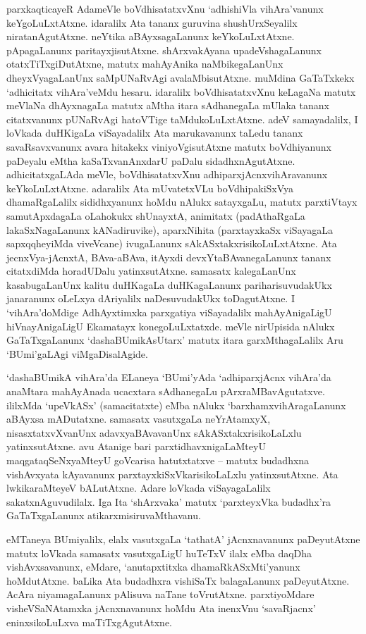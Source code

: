 parxkaqticayeR AdameVle boVdhisatatxvXnu `adhishiVla vihAra'vanunx keYgoLuLxtAtxne. idaralilx Ata tananx guruvina shushUrxSeyalilx niratanAgutAtxne. neYtika aBAyxsagaLanunx keYkoLuLxtAtxne. pApagaLanunx paritayxjisutAtxne. shArxvakAyana upadeVshagaLanunx otatxTiTxgiDutAtxne, matutx mahAyAnika naMbikegaLanUnx dheyxVyagaLanUnx saMpUNaRvAgi avalaMbisutAtxne. muMdina GaTaTxkekx `adhicitatx vihAra'veMdu hesaru. idaralilx boVdhisatatxvXnu keLagaNa matutx meVlaNa dhAyxnagaLa matutx aMtha itara sAdhanegaLa mUlaka tananx citatxvanunx pUNaRvAgi hatoVTige taMdukoLuLxtAtxne. adeV samayadalilx, I loVkada duHKigaLa viSayadalilx Ata marukavanunx taLedu tananx savaRsavxvanunx avara hitakekx viniyoVgisutAtxne matutx boVdhiyanunx paDeyalu eMtha kaSaTxvanAnxdarU paDalu sidadhxnAgutAtxne. adhicitatxgaLAda meVle, boVdhisatatxvXnu adhiparxjAcnxvihAravanunx keYkoLuLxtAtxne. adaralilx Ata mUvatetxVLu boVdhipakiSxVya dhamaRgaLalilx sididhxyanunx hoMdu nAlukx satayxgaLu, matutx parxtiVtayx samutApxdagaLa oLahokukx shUnayxtA, animitatx (padAthaRgaLa lakaSxNagaLanunx kANadiruvike), aparxNihita (parxtayxkaSx viSayagaLa sapxqqheyiMda viveVcane) ivugaLanunx sAkASxtakxrisikoLuLxtAtxne. Ata jecnxVya-jAcnxtA, BAva-aBAva, itAyxdi devxYtaBAvanegaLanunx tananx citatxdiMda horadUDalu yatinxsutAtxne. samasatx kalegaLanUnx kasabugaLanUnx kalitu duHKagaLa duHKagaLanunx pariharisuvudakUkx janaranunx oLeLxya dAriyalilx naDesuvudakUkx toDagutAtxne. I `vihAra'doMdige AdhAyxtimxka parxgatiya viSayadalilx mahAyAnigaLigU hiVnayAnigaLigU Ekamatayx konegoLuLxtatxde. meVle nirUpisida nAlukx GaTaTxgaLanunx `dashaBUmikAsUtarx' matutx itara garxMthagaLalilx Aru `BUmi'gaLAgi viMgaDisalAgide.

`dashaBUmikA vihAra'da ELaneya `BUmi'yAda `adhiparxjAcnx vihAra'da anaMtara mahAyAnada ucacxtara sAdhanegaLu pArxraMBavAgutatxve. ililxMda `upeVkASx' (samacitatxte) eMba nAlukx `barxhamxvihAragaLanunx aBAyxsa mADutatxne. samasatx vasutxgaLa neYrAtamxyX, nisasxtatxvXvanUnx  adavxyaBAvavanUnx sAkASxtakxrisikoLaLxlu yatinxsutAtxne. avu Atanige bari parxtidhavxnigaLaMteyU maqgataqSeNxyaMteyU goVcarisa hatutxtatxve -- matutx budadhxna vishAvxyata kAyavanunx parxtayxkiSxVkarisikoLaLxlu yatinxsutAtxne. Ata lwkikaraMteyeV bALutAtxne. Adare loVkada viSayagaLalilx sakatxnAguvudilalx. Iga Ita `shArxvaka' matutx `parxteyxVka budadhx'ra GaTaTxgaLanunx atikarxmisiruvaMthavanu.

eMTaneya BUmiyalilx, elalx vasutxgaLa `tathatA' jAcnxnavanunx paDeyutAtxne matutx loVkada samasatx vasutxgaLigU huTeTxV ilalx eMba daqDha vishAvxsavanunx, eMdare, `anutapxtitxka dhamaRkASxMti'yanunx hoMdutAtxne. baLika Ata budadhxra vishiSaTx balagaLanunx paDeyutAtxne. AcAra niyamagaLanunx pAlisuva naTane toVrutAtxne. parxtiyoMdare visheVSaNAtamxka jAcnxnavanunx hoMdu Ata inenxVnu `savaRjacnx' eninxsikoLuLxva maTiTxgAgutAtxne.

